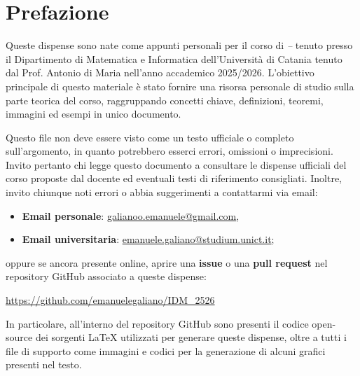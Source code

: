 \chapter*{Prefazione}

\setlength{\parskip}{0.8em}
\setlength{\parindent}{0pt}

Queste dispense sono nate come appunti personali per il corso di \emph{\BookTitle -- \BookSubtitle} tenuto presso il Dipartimento di Matematica e Informatica dell'Universit\`a di Catania tenuto dal Prof. Antonio di Maria nell'anno accademico 2025/2026. L'obiettivo principale di questo materiale è stato fornire una risorsa personale di studio sulla parte teorica del corso, raggruppando concetti chiave, definizioni, teoremi, immagini ed esempi in unico documento. 

Questo file non deve essere visto come un testo ufficiale o completo sull'argomento, in quanto potrebbero esserci errori, omissioni o imprecisioni. Invito pertanto chi legge questo documento a consultare le dispense ufficiali del corso proposte dal docente ed eventuali testi di riferimento consigliati. Inoltre, invito chiunque noti errori o abbia suggerimenti a contattarmi via email:
\begin{itemize}
    \item \textbf{Email personale}: \href{mailto:galianoo.emanuele@gmail.com}{galianoo.emanuele@gmail.com},
    \item \textbf{Email universitaria}: \href{mailto:emanuele.galiano@studium.unict.it}{emanuele.galiano@studium.unict.it};
\end{itemize}

\noindent
oppure se ancora presente online, aprire una \textbf{issue} o una \textbf{pull request} nel repository GitHub associato a queste dispense: 
\begin{center}
\begin{minipage}{0.92\textwidth}
\centering
\url{https://github.com/emanuelegaliano/IDM_2526}
\end{minipage}
\end{center}

In particolare, all'interno del repository GitHub sono presenti il codice open-source dei sorgenti \LaTeX{} utilizzati per generare queste dispense, oltre a tutti i file di supporto come immagini e codici per la generazione di alcuni grafici presenti nel testo. 